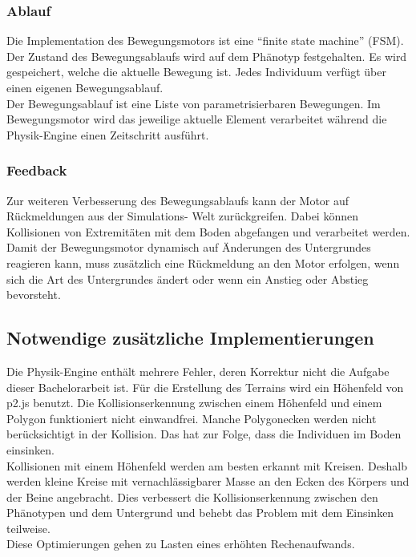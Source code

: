      \subsubsection{Ablauf}

        Die Implementation des Bewegungsmotors ist eine ``finite state machine'' (FSM).
        Der Zustand des Bewegungsablaufs wird auf dem Phänotyp festgehalten.
        Es wird gespeichert, welche die aktuelle Bewegung ist.
        Jedes Individuum verfügt über einen eigenen Bewegungsablauf.
        \\
        Der Bewegungsablauf ist eine Liste von parametrisierbaren Bewegungen.
        Im Bewegungsmotor wird das jeweilige aktuelle Element verarbeitet
        während die Physik-Engine einen Zeitschritt ausführt.

      \subsubsection{Feedback}

        Zur weiteren Verbesserung des Bewegungsablaufs kann der Motor auf Rückmeldungen aus der Simulations-
        Welt zurückgreifen.
        Dabei können Kollisionen von Extremitäten mit dem Boden abgefangen und verarbeitet werden.
        \\
        Damit der Bewegungsmotor dynamisch auf Änderungen des Untergrundes reagieren kann,
        muss zusätzlich eine Rückmeldung an den Motor erfolgen, wenn sich die Art des Untergrundes ändert
        oder wenn ein Anstieg oder Abstieg bevorsteht.
        \\

    \subsection{Notwendige zusätzliche Implementierungen}

      Die Physik-Engine enthält mehrere Fehler, deren Korrektur nicht die Aufgabe dieser Bachelorarbeit ist.
      Für die Erstellung des Terrains wird ein Höhenfeld von p2.js benutzt.
      Die Kollisionserkennung zwischen einem Höhenfeld und einem Polygon funktioniert nicht einwandfrei.
      Manche Polygonecken werden nicht berücksichtigt in der Kollision.
      Das hat zur Folge, dass die Individuen im Boden einsinken.
      \\
      Kollisionen mit einem Höhenfeld werden am besten erkannt mit Kreisen.
      Deshalb werden kleine Kreise mit vernachlässigbarer Masse an den Ecken des Körpers und der Beine angebracht.
      Dies verbessert die Kollisionserkennung zwischen den Phänotypen und dem Untergrund
      und behebt das Problem mit dem Einsinken teilweise.
      \\
      Diese Optimierungen gehen zu Lasten eines erhöhten Rechenaufwands.

